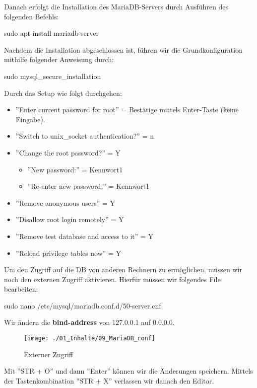 Danach erfolgt die Installation des MariaDB-Servers durch Ausführen des folgenden Befehls:

\begin{Textfeld1}
	sudo apt install mariadb-server
\end{Textfeld1}

Nachdem die Installation abgeschlossen ist, führen wir die Grundkonfiguration mithilfe folgender Anweisung durch:

\begin{Textfeld1}
	sudo mysql\_secure\_installation
\end{Textfeld1}

Durch das Setup wie folgt durchgehen:

\begin{itemize}
	\item ''Enter current password for root'' = Bestätige mittels Enter-Taste (keine Eingabe).
	\item ''Switch to unix\_socket authentication?'' = n
	\item ''Change the root password?'' =  Y
	\begin{itemize}
		\item ''New password:'' = Kennwort1
		\item ''Re-enter new password:'' = Kennwort1
	\end{itemize}
	\item ''Remove anonymous users'' = Y
	\item ''Disallow root login remotely'' = Y
	\item ''Remove test database and access to it'' = Y
	\item ''Reload privilege tables now'' = Y
\end{itemize}

Um den Zugriff auf die \ac{DB} von anderen Rechnern zu ermöglichen, müssen wir noch den externen Zugriff aktivieren. Hierfür müssen wir folgendes File bearbeiten:

\begin{Textfeld1}
	sudo nano /etc/mysql/mariadb.conf.d/50-server.cnf
\end{Textfeld1}

Wir ändern die \textbf{bind-address} von 127.0.0.1 auf 0.0.0.0.

\begin{figure}[H]
	\texttt{[image: ./01\_Inhalte/09\_MariaDB\_conf]}
	\centering
	\caption{Externer Zugriff}
\end{figure}

Mit ''STR + O'' und dann ''Enter'' können wir die Änderungen speichern. Mittels der Tastenkombination ''STR + X'' verlassen wir danach den Editor.

